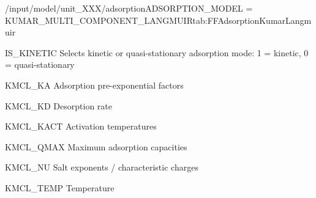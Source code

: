 \begin{condsubgroup}{/input/model/unit\_XXX/adsorption}{ADSORPTION\_MODEL = KUMAR\_MULTI\_COMPONENT\_LANGMUIR}{tab:FFAdsorptionKumarLangmuir}
\begin{dataset}[type=int,range={$\{ 0,1 \}$},length=1]{IS\_KINETIC}
    Selects kinetic or quasi-stationary adsorption mode: 1 = kinetic, 0 = quasi-stationary
  \end{dataset}
  \begin{dataset}[unit=\si{\raiseto{3}\metre\of{MP}\per\mol\per\second}, type=double,range={$\geq 0$},length={\texttt{NCOMP}}]{KMCL\_KA}
    Adsorption pre-exponential factors
  \end{dataset}
  \begin{dataset}[unit=\si{\raiseto{3\nu_i}\metre\of{MP}\per\raiseto{\nu_i}\mol\per\second}, type=double,range={$\geq 0$},length={\texttt{NCOMP}}]{KMCL\_KD}
    Desorption rate
  \end{dataset}
\begin{dataset}[unit=\si{\kelvin}, type = double, range={$\geq 0$}, length={\texttt{NCOMP}}]{KMCL\_KACT} 
  Activation temperatures
  \end{dataset}
\begin{dataset}[unit=\si{\mol\per\cubic\metre\of{SP}} , type = double, range={$> 0$}, length={\texttt{NCOMP}}]{KMCL\_QMAX} 
  Maximum adsorption capacities
  \end{dataset}
\begin{dataset}[type = double, range={$> 0$}, length={\texttt{NCOMP}}]{KMCL\_NU} 
  Salt exponents / characteristic charges 
  \end{dataset}
\begin{dataset}[unit=\si{\kelvin}, type = double, range={$\geq 0$}, length={1}]{KMCL\_TEMP} 
  Temperature 
  \end{dataset}
\end{condsubgroup}

